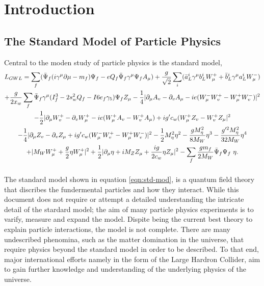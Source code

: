 \section{Introduction}

	\subsection{The Standard Model of Particle Physics}

    Central to the moden study of particle physics is the standard model,
    \begin{multline} \label{eqn:std-mod}
      L_{GWL} = \sum_{f} ( \bar{\Psi}_{f} ( i \gamma^\mu \partial \mu - m_{f} ) \Psi_{f} - eQ_{f} \bar{\Psi}_{f} \gamma^\mu \Psi_{f} A_{\mu} ) + \frac{g}{\sqrt{2}} \sum_{i} ( \bar{a}^i_L \gamma^\mu b^i_L W^+_\mu + \bar{b}^i_L \gamma^\mu a^i_L W^-_\mu )                        \\                           
              + \frac{g}{2x_w} \sum_f \bar{\Psi}_f \gamma^\mu ( I^3_f - 2s^2_w Q_f - I6e_f \gamma_5 ) \Psi_f Z_\mu - \frac{1}{4} | \partial_\mu A_v - \partial_v A_\mu - ie(W^-_\mu W^+_v - W^+_\mu W^-_v ) |^2                                         \\                                     
              - \frac{1}{2} | \partial_\mu W^+_v - \partial_v W^+_\mu - ie ( W^+_\mu A_v - W^+_v A_\mu ) + ig' c_w (W^+_\mu Z_v - W^+_v Z_\mu |^2 \\
              - \frac{1}{4} | \partial_\mu Z_v - \partial_v Z_\mu + ig' c_w (W^-_\mu W^+_v - W^+_\mu W^-_v ) |^2 - \frac{1}{2} M^2_\eta \eta^2  - \frac{gM^2_\eta}{8M_W} \eta^3  - \frac{g'^2 M^2_\eta}{32M_W}\eta^4    \\     
              + | M_W W^+_\mu + \frac{g}{2} \eta W^+_\mu |^2 + \frac{1}{2} | \partial_\mu \eta + i M_Z Z_\mu + \frac{ig}{2c_w} \eta Z_\mu |^2 - \sum_f \frac{g m_f}{2 M_W} \bar{\Psi}_f \Psi_f\ \eta. 
              \vspace{1em}                                                                               
    \end{multline}
    The standard model shown in equation \ref{eqn:std-mod}, is a quantum field theory that discribes the fundermental particles and how they interact.
    While this document does not require or attempt a detailed understanding the intricate detail of the stardard model;
    the aim of many particle physics experiments is to varify, measure and expand the model.
    Dispite being the current best theory to explain particle interactions, the model is not complete.
    There are many undescribed phenomina, such as the matter domination in the universe, that require physics beyond the standard model in order to be described.
    To that end, major international efforts namely in the form of the Large Hardron Collider, aim to gain further knowledge and understanding of the underlying physics of the universe. \cite{ref:std}

